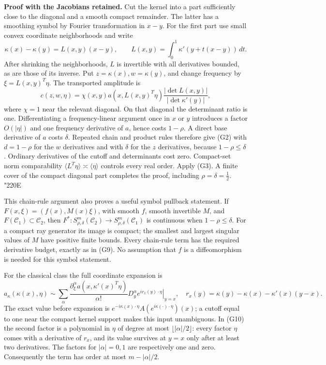 \documentclass[
  11pt,
]{article}
\begin{document}
\textbf{Proof with the Jacobians retained.} Cut the kernel into a part
sufficiently close to the diagonal and a smooth compact remainder. The
latter has a smoothing symbol by Fourier transformation in \(x-y\). For
the first part use small convex coordinate neighborhoods and write \[
\kappa(x)-\kappa(y)=L(x,y)(x-y),\qquad
L(x,y)=\int_0^1\kappa'(y+t(x-y))\,dt.
\tag{G8}
\] After shrinking the neighborhoods, \(L\) is invertible with all
derivatives bounded, as are those of its inverse. Put
\(z=\kappa(x),w=\kappa(y)\), and change frequency by
\(\xi=L(x,y)^T\eta\). The transported amplitude is \[
c(z,w,\eta)=\chi(x,y)a(x,L(x,y)^T\eta)
\frac{|\det L(x,y)|}{|\det\kappa'(y)|},
\tag{G9}
\] where \(\chi=1\) near the relevant diagonal. On that diagonal the
determinant ratio is one. Differentiating a frequency-linear argument
once in \(x\) or \(y\) introduces a factor \(O(|\eta|)\) and one
frequency derivative of \(a\), hence costs \(1-\rho\). A direct base
derivative of \(a\) costs \(\delta\). Repeated chain and product rules
therefore give (G2) with \(d=1-\rho\) for the \(w\) derivatives and with
\(\delta\) for the \(z\) derivatives, because \(1-\rho\leq\delta\).
Ordinary derivatives of the cutoff and determinants cost zero.
Compact-set norm comparability
\(\langle L^T\eta\rangle\asymp\langle\eta\rangle\) controls every real
order. Apply (G3). A finite cover of the compact diagonal part completes
the proof, including \(\rho=\delta=\frac12\). {\ReaderSymbols\char"220E}

This chain-rule argument also proves a useful symbol pullback statement.
If \(F(x,\xi)=(f(x),M(x)\xi)\), with smooth \(f\), smooth invertible
\(M\), and \(F(\mathcal C_1)\subset\mathcal C_2\), then
\(F^*:S^m_{\rho,\delta}(\mathcal C_2)\to S^m_{\rho,\delta}(\mathcal C_1)\)
is continuous when \(1-\rho\leq\delta\). For a compact ray generator its
image is compact; the smallest and largest singular values of \(M\) have
positive finite bounds. Every chain-rule term has the required
derivative budget, exactly as in (G9). No assumption that \(f\) is a
diffeomorphism is needed for this symbol statement.

For the classical class the full coordinate expansion is \[
a_\kappa(\kappa(x),\eta)
\sim\sum_\alpha\frac{\partial_\xi^\alpha a(x,\kappa'(x)^T\eta)}{\alpha!}
\left.D_y^\alpha e^{i r_x(y)\cdot\eta}\right|_{y=x},
\quad
r_x(y)=\kappa(y)-\kappa(x)-\kappa'(x)(y-x).
\tag{G10}
\] The exact value before expansion is
\(e^{-i\kappa(x)\cdot\eta}A(e^{i\kappa(\cdot)\cdot\eta})(x)\); a cutoff
equal to one near the compact kernel support makes this input
unambiguous. In (G10) the second factor is a polynomial in \(\eta\) of
degree at most \(\lfloor|\alpha|/2\rfloor\): every factor \(\eta\) comes
with a derivative of \(r_x\), and its value survives at \(y=x\) only
after at least two derivatives. The factors for \(|\alpha|=0,1\) are
respectively one and zero. Consequently the term has order at most
\(m-|\alpha|/2\).
\end{document}
